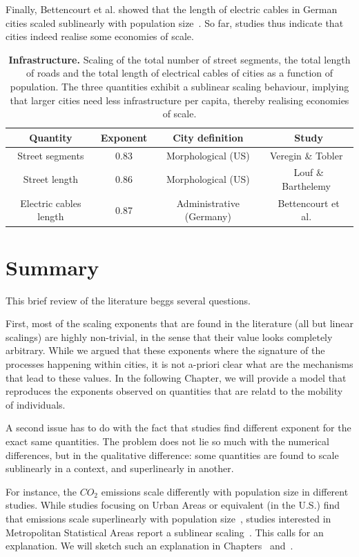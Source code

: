 Finally, Bettencourt et al. showed that the length of electric cables in German
cities scaled sublinearly with population size~\cite{Bettencourt:2007}. So far,
studies thus indicate that cities indeed realise some economies of scale.

\begin{table}[!h]
    \centering
\begin{tabular}{|cccc|}
\hline
Quantity & Exponent & City definition & Study\\
\hline
Street segments & 0.83 & Morphological (US) & Veregin \& Tobler~\cite{Veregin:1997}\\
Street length & 0.86 & Morphological (US) & Louf \& Barthelemy~\cite{Louf:2014_scaling}\\
Electric cables length & 0.87 & Administrative (Germany) & Bettencourt et al.~\cite{Bettencourt:2007}\\
\hline
\end{tabular}
\caption{{\bf Infrastructure. } Scaling of the total number of street segments,
    the total length of roads and the total length of electrical cables of
    cities as a function of population. The three quantities exhibit a sublinear
    scaling behaviour, implying that larger cities need less infrastructure per
    capita, thereby realising economies of scale.
}
\end{table}

\section{Summary}
\label{sec:summary}


This brief review of the literature beggs several questions. 

First, most of the scaling exponents that are found in the literature (all but
linear scalings) are highly non-trivial, in the sense that their value looks
completely arbitrary. While we argued that these exponents where the signature
of the processes happening within cities, it is not a-priori clear what are the
mechanisms that lead to these values. In the following Chapter, we will provide
a model that reproduces the exponents observed on quantities that are relatd to
the mobility of individuals.

A second issue has to do with the fact that studies find different exponent for
the exact same quantities. The problem does not lie so much with the numerical
differences, but in the qualitative difference: some quantities are found to
scale sublinearly in a context, and superlinearly in another. 

For instance, the $CO_2$ emissions scale differently with population size in
different studies. While studies focusing on Urban Areas or equivalent (in the
U.S.) find that emissions scale superlinearly with population
size~\cite{Louf:2014_scaling, Oliveira:2014}, studies interested in Metropolitan
Statistical Areas report a sublinear scaling~\cite{Fragkias:2013}. This calls
for an explanation. We will sketch such an explanation in
Chapters~\cite{chap:scaling_model} and~\cite{chap:scaling_implications}.
